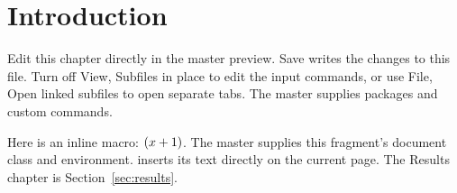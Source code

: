 \section{Introduction}
\label{sec:introduction}
Edit this chapter directly in the master preview. Save writes the changes to
this file. Turn off View, Subfiles in place to edit the input commands, or use
File, Open linked subfiles to open separate tabs. The master supplies packages
and custom commands.

Here is an inline macro: $\left(x+1\right)$. The master supplies this fragment's
document class and environment. \verb|| inserts its text
directly on the current page. The Results chapter is Section~\ref{sec:results}.
